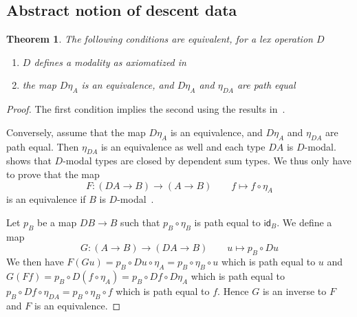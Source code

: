 \documentclass[10pt,a4paper,draft]{article}
\newcommand{\id}{\mathsf{id}}
\newcommand{\D}{D}              %
\renewcommand{\~}{\widetilde}
\newtheorem{theorem}{Theorem}[section]
\theoremstyle{definition}
\theoremstyle{remark} %
\begin{document}
\subsection{Abstract notion of descent data}


\begin{theorem}\label{main}
  The following conditions are equivalent, for a lex operation $\D$
  \begin{enumerate}
  \item $\D$ defines a modality as axiomatized in~\cite{Quirin16,RijkeSS17}
  \item the map $\D\eta_A$ is an equivalence, and $\D\eta_A$ and $\eta_{\D A}$
    are path equal
  \end{enumerate}
\end{theorem}

\begin{proof}
  The first condition implies the second using the results in~\cite{Quirin16,RijkeSS17}.

  Conversely, assume that the map $\D\eta_A$ is an equivalence, and $\D\eta_A$ and $\eta_{\D A}$
  are path equal. Then $\eta_{\D A}$ is an equivalence as well and each type $\D A$ is $\D$\hyp{}modal.
   shows that $\D$\hyp{}modal types are closed by dependent sum types.
  We thus only have to prove that the map
  \begin{equation*}
  F:(\D A\rightarrow B)\longrightarrow (A\rightarrow B) \qquad f\longmapsto f\circ\eta_A
  \end{equation*}
  is an equivalence if $B$ is $\D$\hyp{}modal~\cite{Quirin16}.

  Let $p_B$ be a map $\D B\rightarrow B$ such that $p_B\circ\eta_B$
  is path equal to $\id_B$. We define a map
  \begin{equation*}
  G:(A\rightarrow B)\longrightarrow (\D A\rightarrow B)\qquad u\longmapsto p_B\circ \D u
  \end{equation*}
  We then have $F(Gu) = p_B\circ \D u\circ\eta_A = p_B\circ\eta_B\circ u$ which is path equal to $u$
  and $G(Ff) = p_B\circ \D(f\circ \eta_A) = p_B\circ \D f\circ \D\eta_A$ which is path equal
  to $p_B\circ \D f\circ \eta_{\D A} = p_B\circ\eta_B\circ f$ which is path equal to $f$. Hence $G$
  is an inverse to $F$ and $F$ is an equivalence.
\end{proof}
\end{document}
